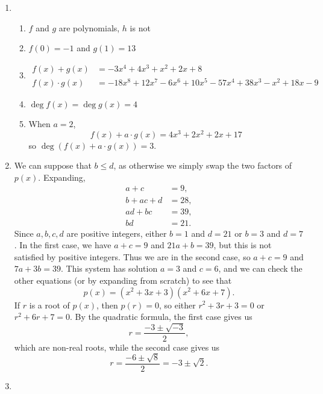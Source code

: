 \begin{enumerate}
\item \begin{enumerate}
\item $f$ and $g$ are polynomials, $h$ is not 
\item $f(0) = -1$ and $g(1) = 13$
\item \begin{align*}
f(x) + g(x) &= -3x^4 + 4x^3 + x^2 + 2x + 8 \\
f(x)\cdot g(x) &= -18x^8 + 12x^7 - 6x^6 + 10x^5 - 57x^4 + 38x^3 - x^2 + 18x - 9
\end{align*}
\item $\deg f(x) = \deg g(x) = 4$
\item When $a = 2$,
\begin{equation*}
f(x) + a\cdot g(x) = 4x^3 + 2x^2 + 2x + 17
\end{equation*}
so $\deg (f(x) + a\cdot g(x)) = 3$.
\end{enumerate}
\item We can suppose that $b\leq d$, as otherwise we simply swap the two factors of $p(x)$. Expanding,
\begin{align*}
a + c &= 9, \\
b + ac + d &= 28, \\
ad + bc &= 39, \\
bd &= 21.
\end{align*}
Since $a,b,c,d$ are positive integers, either $b = 1$ and $d = 21$ or $b = 3$ and $d = 7$. In the first case, we have $a + c = 9$ and $21a + b = 39$, but this is not satisfied by positive integers. Thus we are in the second case, so $a + c = 9$ and $7a + 3b = 39$. This system has solution $a = 3$ and $c = 6$, and we can check the other equations (or by expanding from scratch) to see that
\begin{equation*}
p(x) = (x^2 + 3x + 3)(x^2 + 6x + 7).
\end{equation*}
If $r$ is a root of $p(x)$, then $p(r) = 0$, so either $r^2 + 3r + 3 = 0$ or $r^2 + 6r + 7 = 0$. By the quadratic formula, the first case gives us
\begin{equation*}
r = \frac{-3\pm\sqrt{-3}}{2},
\end{equation*}
which are non-real roots, while the second case gives us
\begin{equation*}
r = \frac{-6\pm\sqrt{8}}{2} = \boxed{-3\pm\sqrt{2}}.
\end{equation*}
\item 
\end{enumerate}
